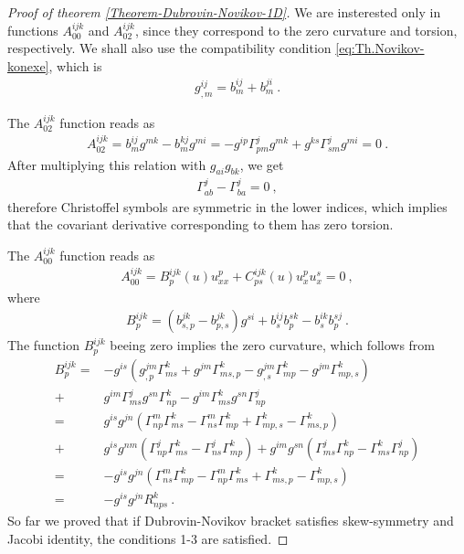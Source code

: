 \begin{proof}[Proof of theorem \ref{Theorem-Dubrovin-Novikov-1D}]
    We are insterested only in functions $A^{ijk}_{00}$ and $A^{ijk}_{02}$, since they correspond to the zero curvature and torsion, respectively. We shall also use the compatibility condition \eqref{eq:Th.Novikov-konexe}, which is
    \begin{align}
        g^{ij}_{,m} = b^{ij}_m + b^{ji}_m \:.
    \end{align}

    The $A^{ijk}_{02}$ function reads as
    \begin{align*}
        A_{02}^{ijk} = b^{ij}_m g^{mk} - b^{kj}_m g^{mi} 
        = -g^{ip} \Gamma^{j}_{pm} g^{mk} + g^{ks} \Gamma^{j}_{sm} g^{mi} = 0\:.
    \end{align*}
    After multiplying this relation with $g_{ai}g_{bk}$, we get
    \begin{align}
        \Gamma^j_{ab} - \Gamma^j_{ba} = 0 \:,
    \end{align}
    therefore Christoffel symbols are symmetric in the lower indices, which implies that the covariant derivative corresponding to them has zero torsion.

    The $A^{ijk}_{00}$ function reads as
    \begin{align}
        A_{00}^{ijk} = B^{ijk}_p(u) u^p_{xx} + C^{ijk}_{ps}(u) u^p_x u^s_x = 0 \:,
    \end{align}
    where
    \begin{align}
        B^{ijk}_p 
        = (b^{jk}_{s,p} - b^{jk}_{p,s}) g^{si} + b_s^{ij} b_p^{sk} - b_s^{ik} b_p^{sj} \:.
    \end{align}
    The function $B^{ijk}_p$ beeing zero implies the zero curvature, which follows from
    \begin{align*}
        B^{ijk}_p  
        =& -g^{is} \left( g^{jm}_{,p} \Gamma^k_{ms} + g^{jm} \Gamma^k_{ms,p} - g^{jm}_{,s} \Gamma^k_{mp} - g^{jm} \Gamma^k_{mp,s} \right) 
        \\ +& g^{im} \Gamma^j_{ms} g^{sn} \Gamma^{k}_{np} - g^{im} \Gamma^k_{ms} g^{sn} \Gamma^j_{np}
        \\ =& g^{is} g^{jn} \left( \Gamma^m_{np} \Gamma^k_{ms} - \Gamma^{m}_{ns} \Gamma^k_{mp} + \Gamma^{k}_{mp,s} -  \Gamma^{k}_{ms,p} \right) 
        \\ +& g^{is} g^{nm} \left( \Gamma^j_{np} \Gamma^{k}_{ms} - \Gamma^j_{ns} \Gamma^k_{mp} \right) + g^{im} g^{sn} \left( \Gamma^j_{ms} \Gamma^k_{np} - \Gamma^k_{ms} \Gamma^j_{np} \right)
        \\ =& -g^{is} g^{jn} \left( \Gamma^{m}_{ns} \Gamma^k_{mp}  - \Gamma^m_{np} \Gamma^k_{ms} + \Gamma^{k}_{ms,p} - \Gamma^{k}_{mp,s} \right)
        \\ =& -g^{is} g^{jn} R^k_{nps} \:.
    \end{align*}
    So far we proved that if Dubrovin-Novikov bracket satisfies skew-symmetry and Jacobi identity, the conditions 1-3 are satisfied.


\end{proof}
